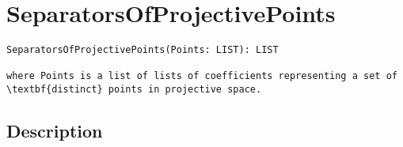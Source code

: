 \documentclass[a4paper]{mybook}
\newenvironment{command}{}{} %
\begin{document}
\section{SeparatorsOfProjectivePoints}
\label{SeparatorsOfProjectivePoints}
\begin{command} %


\begin{Verbatim}[label=syntax, rulecolor=\color{MidnightBlue},
frame=single]
SeparatorsOfProjectivePoints(Points: LIST): LIST

where Points is a list of lists of coefficients representing a set of
\textbf{distinct} points in projective space.
\end{Verbatim}


\subsection*{Description}


\end{command}
\end{document}
